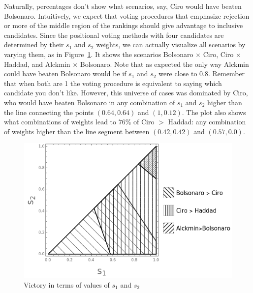 \documentclass[hidelinks,11pt]{article}
\begin{document}
Naturally, percentages don't show what scenarios, say, Ciro would have beaten Bolsonaro. Intuitively, we expect that voting procedures that emphasize rejection or more of the middle region of the rankings should give advantage to inclusive candidates. Since the positional voting methods with four candidates are determined by their \(s_{1}\) and \(s_{2}\) weights, we can actually visualize all scenarios by varying them,   as in Figure~\ref{fig:positional4c}. It shows the scenarios Bolsonaro \(\times\) Ciro, Ciro \(\times \) Haddad, and Alckmin \(\times\) Bolsonaro. Note that as expected the only way Alckmin could have beaten Bolsonaro would be if \(s_{1}\) and \(s_{2}\) were close to 0.8. Remember that when both are 1 the voting procedure is equivalent to saying which candidate you don't like. However, this universe of cases was dominated by Ciro, who would have beaten Bolsonaro in any combination of \(s_{1}\) and \(s_{2}\) higher than the line connecting the points \((0.64,0.64)\) and \((1,0.12)\). The plot also shows what combinations of weights lead to \(76\%\) of Ciro \(>\) Haddad: any combination of weights higher than the line segment between \((0.42,0.42)\) and \((0.57,0.0)\).

\begin{figure}[H]
 \centering
 \includegraphics[width=\columnwidth,
 height=0.3\textheight]{./images/positional_results.png}
\caption{Victory in terms of values of \(s_{1}\) and \(s_{2}\)}
 \label{fig:positional4c}
\end{figure}
\end{document}
